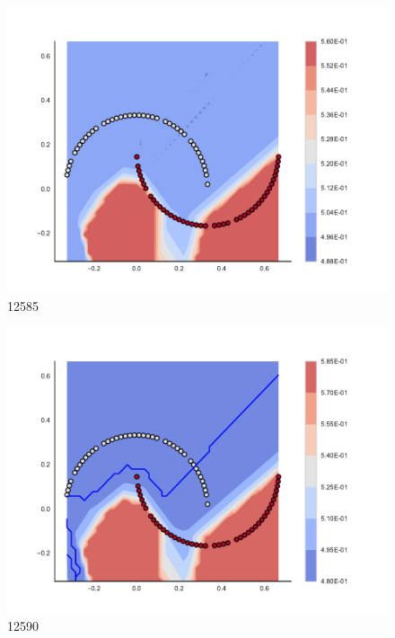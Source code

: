 \begin{subfigure}[b]{0.09\textwidth}
    \includegraphics[clip, trim=2.35cm 1.75cm 4.5cm 0cm,width=\textwidth]{img/convergence/12585.pdf}
    \caption{12585}
    \label{fig:convergence_12585}
\end{subfigure}
%
\begin{subfigure}[b]{0.09\textwidth}
    \includegraphics[clip, trim=2.35cm 1.75cm 4.5cm 0cm,width=\textwidth]{img/convergence/12590.pdf}
    \caption{12590}
    \label{fig:convergence_12590}
\end{subfigure}
%
